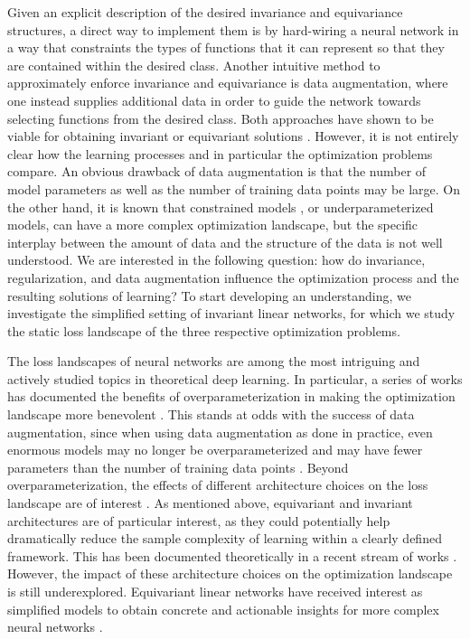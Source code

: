 \documentclass{article}
\theoremstyle{plain}
\theoremstyle{definition}
\theoremstyle{remark}
\theoremstyle{remark}
\begin{document}
Given an explicit description of the desired invariance and equivariance structures, a direct way to implement them is by hard-wiring a neural network in a way that constraints the types of functions that it can represent so that they are contained within the desired class. 
Another intuitive method to approximately enforce invariance and equivariance is data augmentation, where one instead supplies additional data in order to guide the network towards selecting functions from the desired class.
Both approaches have shown to be viable for obtaining invariant or equivariant solutions \citep[see, e.g.,][]{gerken_2024, moskalev2023ginvariance}. 
However, it is not entirely clear how the learning processes and in particular the optimization problems compare. 
An obvious drawback of data augmentation is that the number of model parameters as well as the number of training data points may be large. 
On the other hand, it is known that constrained models \citep{finzi_2021}, or underparameterized models, can have a more complex optimization landscape, but the specific interplay between the amount of data and the structure of the data is not well understood. 
We are interested in the following question: how do invariance, regularization, and data augmentation influence the optimization process and the resulting solutions of learning? 
To start developing an understanding, we investigate the simplified setting of invariant linear networks, for which we study the static loss landscape of the three respective optimization problems.

The loss landscapes of neural networks are among the most intriguing and actively studied topics in theoretical deep learning. 
In particular, a series of works has documented the benefits of overparameterization in making the optimization landscape more benevolent \citep[see, e.g.,][]{poston1991local, gori1992problem, soltanolkotabi2019theoretical, simsek2021a, simsek2023, karhadkar2024mildly}. 
This stands at odds with the success of data augmentation, since when using data augmentation as done in practice, even enormous models may no longer be overparameterized and may have fewer parameters than the number of training data points \citep[see, e.g.,][]{Garg22, Belkin19}. 
Beyond overparameterization, the effects of different architecture choices on the loss landscape are of interest \citep[see, e.g.,][]{li2018visualizing}. 
As mentioned above, equivariant and invariant architectures are of particular interest, as they could potentially help dramatically reduce the sample complexity of learning within a clearly defined framework. 
This has been documented theoretically in a recent stream of works \citep[see, e.g.,][]{mei21a, tahmasebi2023}. 
However, the impact of these architecture choices on the optimization landscape is still underexplored. 
Equivariant linear networks have received interest as simplified models to obtain concrete and actionable insights for more complex neural networks \citep[see, e.g.,][]{chen2023implicit, kohn2022geometry, zhao2023symmetries, nordenfors2024optimization}.
\end{document}
